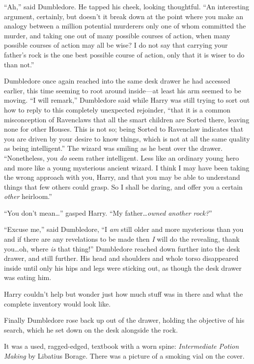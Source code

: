 “Ah,” said Dumbledore. He tapped his cheek, looking thoughtful.
“An interesting argument, certainly, but doesn’t it break down at the point where you make an analogy between a million potential murderers only one of whom committed the murder, and taking one out of many possible courses of action, when many possible courses of action may all be wise? I do not say that carrying your father’s rock is the one best possible course of action, only that it is wiser to do than not.”

Dumbledore once again reached into the same desk drawer he had accessed earlier, this time seeming to root around inside—at least his arm seemed to be moving.
“I will remark,” Dumbledore said while Harry was still trying to sort out how to reply to this completely unexpected rejoinder, “that it is a common misconception of Ravenclaws that all the smart children are Sorted there, leaving none for other Houses. This is not so; being Sorted to Ravenclaw indicates that you are driven by your desire to know things, which is not at all the same quality as being intelligent.” The wizard was smiling as he bent over the drawer.
“Nonetheless, you \emph{do} seem rather intelligent. Less like an ordinary young hero and more like a young mysterious ancient wizard. I think I may have been taking the wrong approach with you, Harry, and that you may be able to understand things that few others could grasp. So I shall be daring, and offer you a certain \emph{other} heirloom.”

“You don’t mean…” gasped Harry.
“My father…\emph{owned another rock?}”

“Excuse me,” said Dumbledore,
“I \emph{am} still older and more mysterious than you and if there are any revelations to be made then \emph{I} will do the revealing, thank you…oh, where \emph{is} that thing!” Dumbledore reached down further into the desk drawer, and still further. His head and shoulders and whole torso disappeared inside until only his hips and legs were sticking out, as though the desk drawer was eating him.

Harry couldn’t help but wonder just how much stuff was in there and what the complete inventory would look like.

Finally Dumbledore rose back up out of the drawer, holding the objective of his search, which he set down on the desk alongside the rock.

It was a used, ragged-edged, textbook with a worn spine: \emph{Intermediate Potion Making} by Libatius Borage. There was a picture of a smoking vial on the cover.

